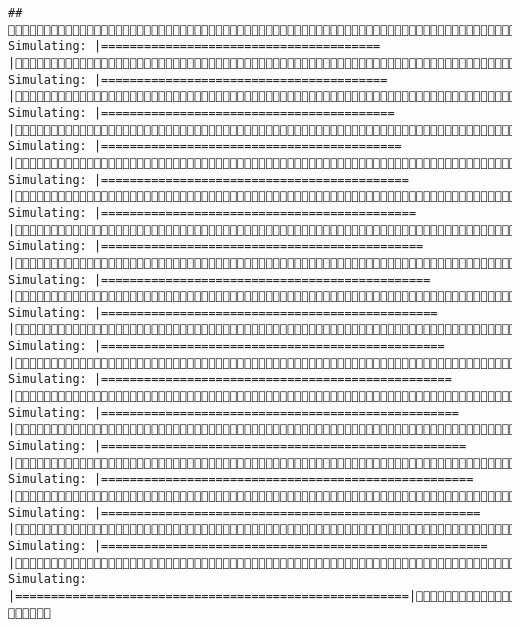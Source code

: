 \documentclass[]{article}
\begin{document}
\begin{verbatim}
## (4/4) Simulating: |=======================================                |(4/4) Simulating: |========================================               |(4/4) Simulating: |=========================================              |(4/4) Simulating: |==========================================             |(4/4) Simulating: |===========================================            |(4/4) Simulating: |============================================           |(4/4) Simulating: |=============================================          |(4/4) Simulating: |==============================================         |(4/4) Simulating: |===============================================        |(4/4) Simulating: |================================================       |(4/4) Simulating: |=================================================      |(4/4) Simulating: |==================================================     |(4/4) Simulating: |===================================================    |(4/4) Simulating: |====================================================   |(4/4) Simulating: |=====================================================  |(4/4) Simulating: |====================================================== |(4/4) Simulating: |=======================================================|(4/4) 
\end{verbatim}
\end{document}
